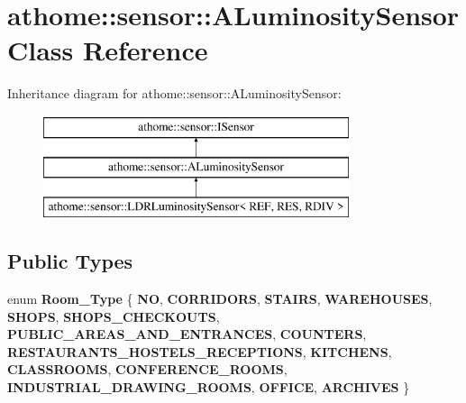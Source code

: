 \hypertarget{classathome_1_1sensor_1_1_a_luminosity_sensor}{}\section{athome\+:\+:sensor\+:\+:A\+Luminosity\+Sensor Class Reference}
\label{classathome_1_1sensor_1_1_a_luminosity_sensor}
Inheritance diagram for athome\+:\+:sensor\+:\+:A\+Luminosity\+Sensor\+:\begin{figure}[H]
\begin{center}
\leavevmode
\includegraphics[height=3.000000cm]{classathome_1_1sensor_1_1_a_luminosity_sensor}
\end{center}
\end{figure}
\subsection*{Public Types}
\begin{DoxyCompactItemize}
\item 
\mbox{\label{classathome_1_1sensor_1_1_a_luminosity_sensor_ac37c468d472b025ba2212940fd615186}} 
enum {\bfseries Room\+\_\+\+Type} \{ \newline
{\bfseries NO}, 
{\bfseries C\+O\+R\+R\+I\+D\+O\+RS}, 
{\bfseries S\+T\+A\+I\+RS}, 
{\bfseries W\+A\+R\+E\+H\+O\+U\+S\+ES}, 
\newline
{\bfseries S\+H\+O\+PS}, 
{\bfseries S\+H\+O\+P\+S\+\_\+\+C\+H\+E\+C\+K\+O\+U\+TS}, 
{\bfseries P\+U\+B\+L\+I\+C\+\_\+\+A\+R\+E\+A\+S\+\_\+\+A\+N\+D\+\_\+\+E\+N\+T\+R\+A\+N\+C\+ES}, 
{\bfseries C\+O\+U\+N\+T\+E\+RS}, 
\newline
{\bfseries R\+E\+S\+T\+A\+U\+R\+A\+N\+T\+S\+\_\+\+H\+O\+S\+T\+E\+L\+S\+\_\+\+R\+E\+C\+E\+P\+T\+I\+O\+NS}, 
{\bfseries K\+I\+T\+C\+H\+E\+NS}, 
{\bfseries C\+L\+A\+S\+S\+R\+O\+O\+MS}, 
{\bfseries C\+O\+N\+F\+E\+R\+E\+N\+C\+E\+\_\+\+R\+O\+O\+MS}, 
\newline
{\bfseries I\+N\+D\+U\+S\+T\+R\+I\+A\+L\+\_\+\+D\+R\+A\+W\+I\+N\+G\+\_\+\+R\+O\+O\+MS}, 
{\bfseries O\+F\+F\+I\+CE}, 
{\bfseries A\+R\+C\+H\+I\+V\+ES}
 \}
\end{DoxyCompactItemize}
